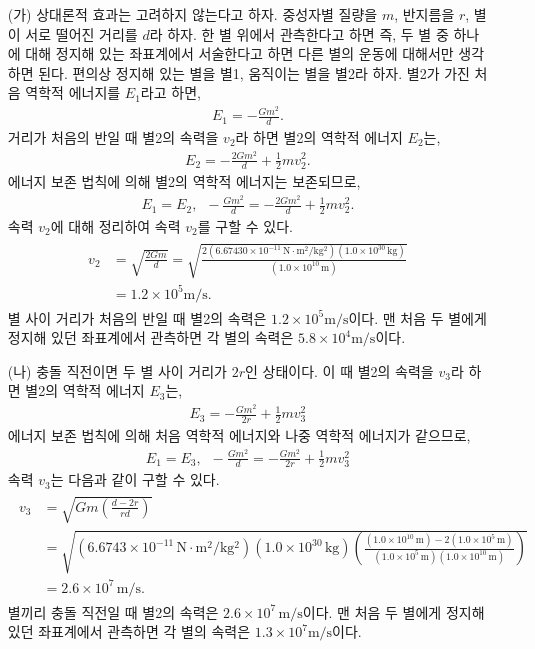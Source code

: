 \documentclass[floatfix,nofootinbib,superscriptaddress,fleqn]{revtex4-2}
\begin{document}
\begin{itemize}
  \item[(가)]
  상대론적 효과는 고려하지 않는다고 하자. 중성자별 질량을 $m$, 반지름을 $r$, 
별이 서로 떨어진 거리를 $d$라 하자. 한 별 위에서 관측한다고 하면 즉,
두 별 중 하나에 대해 정지해 있는 좌표계에서 서술한다고 하면 다른 별의 운동에 대해서만 생각하면 된다. 
편의상 정지해 있는 별을 별1, 움직이는 별을 별2라 하자.
별2가 가진 처음 역학적 에너지를 $E_1$라고 하면,
\begin{align}
    E_1 = -\frac{Gm^2}{d}.
\end{align}
거리가 처음의 반일 때 별2의 속력을 $v_2$라 하면 별2의 역학적 에너지 $E_2$는,
\begin{align}
    E_2 = -\frac{2Gm^2}{d}+ \frac{1}{2}mv_2^2.
\end{align}
에너지 보존 법칙에 의해 별2의 역학적 에너지는 보존되므로,
\begin{align}
    E_1=E_2,\,\,\,-\frac{Gm^2}{d}=-\frac{2Gm^2}{d}+ \frac{1}{2}mv_2^2.
\end{align}
속력 $v_2$에 대해 정리하여 속력 $v_2$를 구할 수 있다.
\begin{align}
    \begin{split}
        v_2 &= \sqrt{\frac{2Gm}{d}} 
        =\sqrt{\frac{2(6.67430\times 10^{-11}\,\mathrm{N\cdot m^2/kg^2})
        (1.0\times 10^{30}\,\mathrm{kg})}{(1.0\times 10^{10}\,\mathrm{m})}} \\
        &=1.2\times 10^5\mathrm{m/s}.
    \end{split}
\end{align}
별 사이 거리가 처음의 반일 때 별2의 속력은 $1.2\times 10^5\mathrm{m/s}$이다. 
맨 처음 두 별에게 정지해 있던 좌표계에서 관측하면 각 별의 속력은 $5.8\times 10^4\mathrm{m/s}$이다. 
  \item[(나)] 
  충돌 직전이면 두 별 사이 거리가 $2r$인 상태이다. 이 때 별2의 속력을 $v_3$라 하면 
별2의 역학적 에너지 $E_3$는,
\begin{align}
    E_3 =-\frac{Gm^2}{2r} + \frac{1}{2}mv_3^2
\end{align}
에너지 보존 법칙에 의해 처음 역학적 에너지와 나중 역학적 에너지가 같으므로,
\begin{align}
    E_1 = E_3,\,\,\, -\frac{Gm^2}{d}=-\frac{Gm^2}{2r} + \frac{1}{2}mv_3^2
\end{align}
속력 $v_3$는 다음과 같이 구할 수 있다.
\begin{align}
    \begin{split}
        v_3&=\sqrt{Gm\left(\frac{d-2r}{rd}\right)}  \\ 
        &=\sqrt{(6.6743\times 10^{-11}\,\mathrm{N\cdot m^2/kg^2})
        (1.0\times 10^{30}\,\mathrm{kg})
        \left(\frac{(1.0\times 10^{10}\,\mathrm{m})-2(1.0\times 10^{5}\,\mathrm{m})}
        {(1.0\times 10^{5}\,\mathrm{m})(1.0\times 10^{10}\,\mathrm{m})}\right)} \\
        &=2.6\times 10^7\,\mathrm{m/s}.
    \end{split}
\end{align}
별끼리 충돌 직전일 때 별2의 속력은 $2.6\times 10^7\,\mathrm{m/s}$이다. 
맨 처음 두 별에게 정지해 있던 좌표계에서 관측하면 각 별의 속력은 $1.3\times 10^7\mathrm{m/s}$이다.
\end{itemize}
\end{document}
